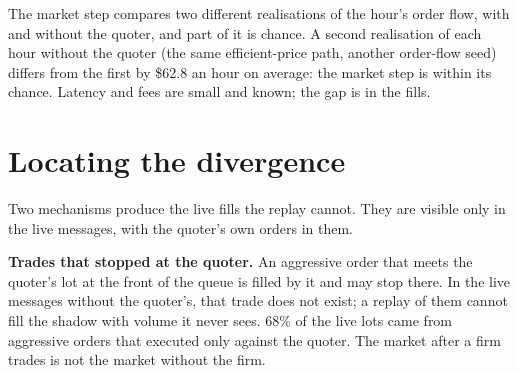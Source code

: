 The market step compares two different realisations of the hour's order flow, with and without the quoter, and part of it is chance. A second realisation of each hour
without the quoter (the same efficient-price path, another order-flow seed) differs from the first by \$62.8 an hour on average: the market step is within its chance.
Latency and fees are small and known; the gap is in the fills.

\begin{omfigure}

\label{fig:rs:simulation-versus-live:waterfall}
\end{omfigure}

\section{Locating the divergence}

Two mechanisms produce the live fills the replay cannot. They are visible only in the live messages, with the quoter's own orders in them.

\textbf{Trades that stopped at the quoter.} An aggressive order that meets the quoter's lot at the front of the queue is filled by it and may stop there. In the live
messages without the quoter's, that trade does not exist; a replay of them cannot fill the shadow with volume it never sees. 68\% of the live lots came from aggressive
orders that executed only against the quoter. The market after a firm trades is not the market without the firm.

